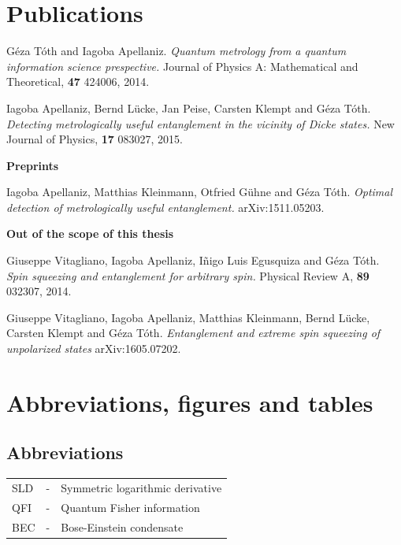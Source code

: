 \documentclass[12pt, letterpaper, twoside]{article}
\numberwithin{equation}{section}
\numberwithin{figure}{section}
\numberwithin{table}{section}
\begin{document}
\section*{Publications}
{\setlength{\parindent}{0cm}
G\'eza T\'oth and Iagoba Apellaniz.
\textit{Quantum metrology from a quantum information science prespective.}
Journal of Physics A: Mathematical and Theoretical, \textbf{47} 424006, 2014.
\vspace{6pt}

Iagoba Apellaniz, Bernd L\"ucke, Jan Peise, Carsten Klempt and G\'eza T\'oth.
\textit{Detecting metrologically useful entanglement in the vicinity of Dicke states.}
New Journal of Physics, \textbf{17} 083027, 2015.
\vspace{6pt}

{\large\bf Preprints}

Iagoba Apellaniz, Matthias Kleinmann, Otfried G\"uhne and G\'eza T\'oth.
\textit{Optimal detection of metrologically useful entanglement.}
arXiv:1511.05203.
\vspace{6pt}

{\large\bf Out of the scope of this thesis}

Giuseppe Vitagliano, Iagoba Apellaniz, I\~nigo Luis Egusquiza and G\'eza T\'oth.
\textit{Spin squeezing and entanglement for arbitrary spin.}
Physical Review A, \textbf{89} 032307, 2014.
\vspace{6pt}

Giuseppe Vitagliano, Iagoba Apellaniz, Matthias Kleinmann, Bernd L\"ucke, Carsten Klempt and G\'eza T\'oth.
\textit{Entanglement and extreme spin squeezing of unpolarized states} arXiv:1605.07202.
}


\vspace*{100pt}
\tableofcontents

\section*{Abbreviations, figures and tables}
\fancyfoot[LE,RO]{\thepage}
\subsection*{Abbreviations}
\begin{tabular}{l c l}
  SLD & - & Symmetric logarithmic derivative \\
  QFI & - & Quantum Fisher information \\
  BEC & - & Bose-Einstein condensate
\end{tabular}
\end{document}
